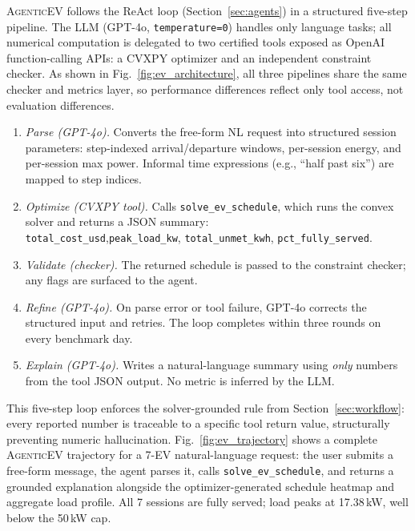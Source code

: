 \documentclass[journal,onecolumn]{IEEEtran} %
\begin{document}
 \textsc{AgenticEV} follows the ReAct loop (Section~\ref{sec:agents}) in a structured five-step pipeline. The LLM (GPT-4o, \texttt{temperature=0}) handles only language tasks; all numerical computation is delegated to two certified tools exposed as OpenAI function-calling APIs: a CVXPY optimizer and an independent constraint checker. As shown in Fig.~\ref{fig:ev_architecture}, all three pipelines share the same checker and metrics layer, so performance differences reflect only tool access, not evaluation differences.
\begin{enumerate}[leftmargin=*,label=\arabic*,itemsep=1pt]   
\item \textit{Parse (GPT-4o).} Converts the free-form NL request into structured session parameters: step-indexed arrival/departure windows, per-session energy, and per-session max power. Informal time expressions (e.g., ``half past six'') are mapped to step indices.  
\item \textit{Optimize (CVXPY tool).} Calls     \texttt{solve\_ev\_schedule}, which runs the convex solver and returns a JSON summary: \\
\texttt{total\_cost\_usd},\texttt{peak\_load\_kw}, \texttt{total\_unmet\_kwh},     \texttt{pct\_fully\_served}.  
\item \textit{Validate (checker).} The returned schedule is passed to the constraint checker; any flags are surfaced to the agent.   
\item \textit{Refine (GPT-4o).} On parse error or tool failure, GPT-4o corrects the structured input and retries. The loop completes within three rounds on every benchmark day.   
\item \textit{Explain (GPT-4o).} Writes a natural-language summary using \emph{only} numbers from the tool JSON output. No metric is inferred by the LLM. 
\end{enumerate}

This five-step loop enforces the solver-grounded rule from Section~\ref{sec:workflow}: every reported number is traceable to a specific tool return value, structurally preventing numeric hallucination. Fig.~\ref{fig:ev_trajectory} shows a complete \textsc{AgenticEV} trajectory for a 7-EV natural-language request: the user submits a free-form message, the agent parses it, calls \texttt{solve\_ev\_schedule}, and returns a grounded explanation alongside the optimizer-generated schedule heatmap and aggregate load profile. All 7 sessions are fully served; load peaks at 17.38\,kW, well below the 50\,kW cap.
\end{document}
